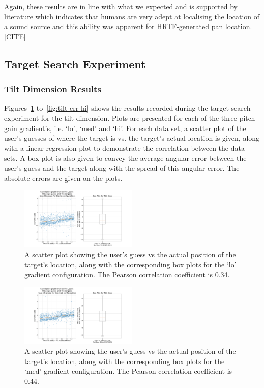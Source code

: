 \documentclass[format=sigconf, review=true, screen=true, anonymous=true]{acmart}
\begin{document}
Again, these results are in line with what we expected and is supported by literature which indicates that humans are very adept at localising the location of a sound source and this ability was apparent for HRTF-generated pan location. [CITE]

\subsection{Target Search Experiment}

\subsubsection{Tilt Dimension Results}

Figures~\ref{fig:tilt-err-lo} to~\ref{fig:tilt-err-hi} shows the results recorded during the target search experiment for the tilt dimension. Plots are presented for each of the three pitch gain gradient's, i.e. `lo', `med' and `hi'. For each data set, a scatter plot of the user's guesses of where the target is vs. the target's actual location is given, along with a linear regression plot to demonstrate the correlation between the data sets. A box-plot is also given to convey the average angular error between the user's guess and the target along with the spread of this angular error. The absolute errors are given on the plots.

\begin{figure}
  \centering
  \includegraphics[width=0.5\textwidth]{figures/tilt_err_lo.png}
  \caption{A scatter plot showing the user's guess vs the actual position of the target's location, along with the corresponding box plots for the `lo' gradient configuration. The Pearson correlation coefficient is 0.34. }
  \label{fig:tilt-err-lo}
\end{figure}

\begin{figure}
  \centering
  \includegraphics[width=0.5\textwidth]{figures/tilt_err_med.png}
  \caption{A scatter plot showing the user's guess vs the actual position of the target's location, along with the corresponding box plots for the `med' gradient configuration. The Pearson correlation coefficient is 0.44. }
  \label{fig:tilt-err-med}
\end{figure}
\end{document}

